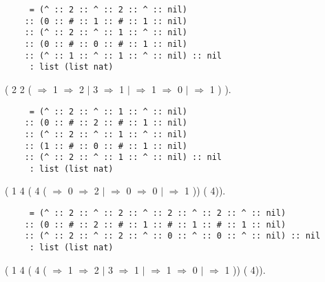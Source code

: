 \documentclass[12pt]{report}
\begin{document}
\begin{verbatim}
     = (^ :: 2 :: ^ :: 2 :: ^ :: nil)
    :: (0 :: # :: 1 :: # :: 1 :: nil)
    :: (^ :: 2 :: ^ :: 1 :: ^ :: nil)
    :: (0 :: # :: 0 :: # :: 1 :: nil)
    :: (^ :: 1 :: ^ :: 1 :: ^ :: nil) :: nil
     : list (list nat)
\end{verbatim}
  \begin{coqdoccode}
\coqdocemptyline
\coqdocnoindent
{} ( 2 2 (   \ensuremath{\Rightarrow}    1 \ensuremath{\Rightarrow} 2 \ensuremath{|} 3 \ensuremath{\Rightarrow} 1 \ensuremath{|} \coqdocvar{\_} \ensuremath{\Rightarrow}    1 \ensuremath{\Rightarrow} 0 \ensuremath{|} \coqdocvar{\_} \ensuremath{\Rightarrow} 1  )  ).\coqdoceol
\end{coqdoccode}
 
\begin{verbatim}
     = (^ :: 2 :: ^ :: 1 :: ^ :: nil)
    :: (0 :: # :: 2 :: # :: 1 :: nil)
    :: (^ :: 2 :: ^ :: 1 :: ^ :: nil)
    :: (1 :: # :: 0 :: # :: 1 :: nil)
    :: (^ :: 2 :: ^ :: 1 :: ^ :: nil) :: nil
     : list (list nat)
\end{verbatim}
  \begin{coqdoccode}
\coqdocemptyline
\coqdocnoindent
{} ( 1 4 ( 4 (   \ensuremath{\Rightarrow}    0 \ensuremath{\Rightarrow} 2 \ensuremath{|} \coqdocvar{\_} \ensuremath{\Rightarrow}    0 \ensuremath{\Rightarrow} 0 \ensuremath{|} \coqdocvar{\_} \ensuremath{\Rightarrow} 1  ))  ( 4)).\coqdoceol
\end{coqdoccode}
 
\begin{verbatim}
     = (^ :: 2 :: ^ :: 2 :: ^ :: 2 :: ^ :: 2 :: ^ :: nil)
    :: (0 :: # :: 2 :: # :: 1 :: # :: 1 :: # :: 1 :: nil)
    :: (^ :: 2 :: ^ :: 2 :: ^ :: 0 :: ^ :: 0 :: ^ :: nil) :: nil
     : list (list nat)
\end{verbatim}
  \begin{coqdoccode}
\coqdocemptyline
\coqdocnoindent
{} ( 1 4 ( 4 (   \ensuremath{\Rightarrow}    1 \ensuremath{\Rightarrow} 2 \ensuremath{|} 3 \ensuremath{\Rightarrow} 1 \ensuremath{|} \coqdocvar{\_} \ensuremath{\Rightarrow}    1 \ensuremath{\Rightarrow} 0 \ensuremath{|} \coqdocvar{\_} \ensuremath{\Rightarrow} 1  ))  ( 4)).\coqdoceol
\end{coqdoccode}
 
\end{document}
